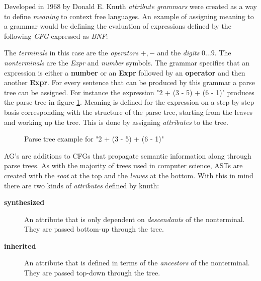 \documentclass[twoside, titlepage, openright, a4paper]{book}
\newcommand{\ags}{\emph{attribute grammars }}
\begin{document}
Developed in 1968 by Donald E. Knuth \ags were created as a way to define \emph{meaning} to context free languages. An example of assigning meaning to a grammar would be defining the evaluation of expressions defined by the following \emph{CFG} expressed as \emph{BNF}:



The \emph{terminals} in this case are the \emph{operators} $+,-$ and the \emph{digits} $0\ldots 9$. The \emph{nonterminals} are the \emph{Expr} and \emph{number} symbols. The grammar specifies that an expression is either a \textbf{number} or an \textbf{Expr} followed by an \textbf{operator} and then another \textbf{Expr}. For every sentence that can be produced by this grammar a parse tree can be assigned. For instance the expression "2 + (3 - 5) + (6 - 1)" produces the parse tree in figure \ref{fig.example1.parsetree}. Meaning is defined for the expression on a step by step basis corresponding with the structure of the parse tree, starting from the leaves and working up the tree. This is done by assigning \emph{attributes} to the tree.

\begin{figure}[H]
\centering
{}
\caption{Parse tree example for "2 + (3 - 5) + (6 - 1)"}
\label{fig.example1.parsetree}
\end{figure}

AG's are additions to CFGs that propagate semantic information along through parse trees. As with the majority of trees used in computer science, ASTs are created with the \emph{root} at the top and the \emph{leaves} at the bottom. With this in mind there are two kinds of \emph{attributes} defined by knuth\cite{knuth1}:
\begin{description}
\item[\textbf{synthesized}] An attribute that is only dependent on \emph{descendants} of the nonterminal. They are passed bottom-up through the tree.
\item[\textbf{inherited}] An attribute that is defined in terms of the \emph{ancestors} of the nonterminal. They are passed top-down through the tree.
\end{description}
\end{document}

